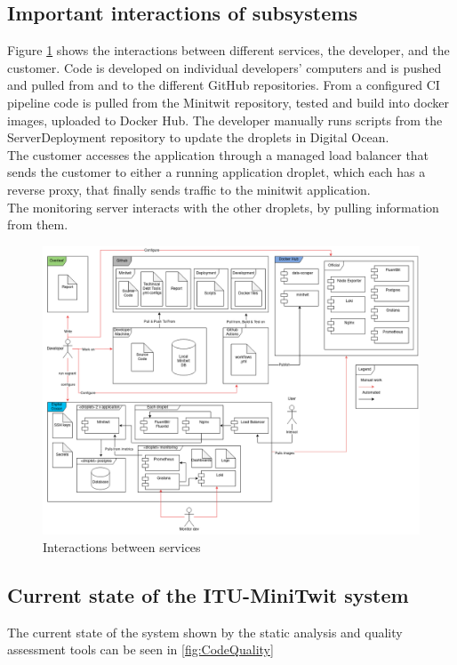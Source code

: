\subsection{Important interactions of subsystems}
Figure \ref{fig:interactions} shows the interactions between different services, the developer, and the customer. Code is developed on individual developers' computers and is pushed and pulled from and to the different GitHub repositories. From a configured CI pipeline code is pulled from the Minitwit repository, tested and build into docker images, uploaded to Docker Hub. The developer manually runs scripts from the ServerDeployment repository to update the droplets in Digital Ocean.\\
The customer accesses the application through a managed load balancer that sends the customer to either a running application droplet, which each has a reverse proxy, that finally sends traffic to the minitwit application.\\
The monitoring server interacts with the other droplets, by pulling information from them. 
\begin{figure}[H]
    \centering
    \includegraphics[width=\linewidth]{images/diagrams/Interactions.png}
    \caption{Interactions between services}
    \label{fig:interactions}
\end{figure}


\subsection{Current state of the ITU-MiniTwit system}
The current state of the system shown by the static analysis and quality assessment tools can be seen in \autoref{fig:CodeQuality}

